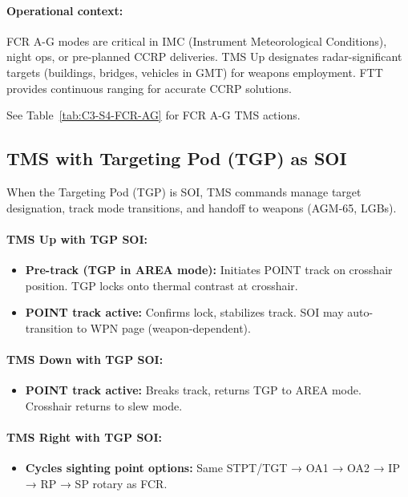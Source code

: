 \documentclass[11pt, a4paper, twoside]{report}
\begin{document}
\paragraph{Operational context:}
FCR A-G modes are critical in IMC (Instrument Meteorological Conditions), night ops, or pre-planned CCRP deliveries. TMS Up designates radar-significant targets (buildings, bridges, vehicles in GMT) for weapons employment. FTT provides continuous ranging for accurate CCRP solutions.

See Table~\ref{tab:C3-S4-FCR-AG} for FCR A-G TMS actions.

\subsection{TMS with Targeting Pod (TGP) as SOI}
\label{sec:C3-S4-S2}

When the Targeting Pod (TGP) is SOI, TMS commands manage target designation, track mode transitions, and handoff to weapons (AGM-65, LGBs).

\paragraph{TMS Up with TGP SOI:}
\begin{itemize}
    \item \textbf{Pre-track (TGP in AREA mode):} Initiates POINT track on crosshair position. TGP locks onto thermal contrast at crosshair.
    \item \textbf{POINT track active:} Confirms lock, stabilizes track. SOI may auto-transition to WPN page (weapon-dependent).
\end{itemize}

\paragraph{TMS Down with TGP SOI:}
\begin{itemize}
    \item \textbf{POINT track active:} Breaks track, returns TGP to AREA mode. Crosshair returns to slew mode.
\end{itemize}

\paragraph{TMS Right with TGP SOI:}
\begin{itemize}
    \item \textbf{Cycles sighting point options:} Same STPT/TGT → OA1 → OA2 → IP → RP → SP rotary as FCR.
\end{itemize}
\end{document}
